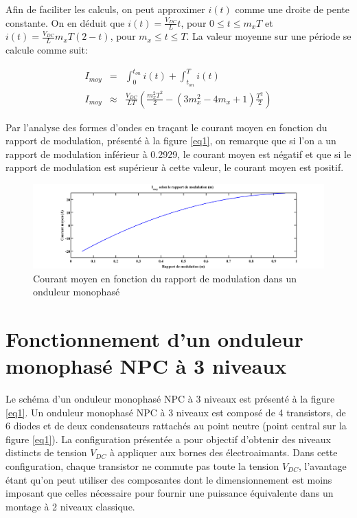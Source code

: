 \documentclass[11pt,letterpaper,final]{report}
\begin{document}
Afin de faciliter les calculs, on peut approximer $i(t)$ comme une droite de pente constante. On en déduit que $i(t) = \frac{V_{DC}}{L}t$, pour $0\leq t \leq m_x T$ et $i(t) = \frac{V_{DC}}{L} m_x T \left( 2 - t\right)$, pour $m_x\leq t \leq T$. La valeur moyenne sur une période se calcule comme suit:

\begin{eqnarray}
I_{moy} &=& \int_0^{t_{on}} i(t) + \int_{t_{on}}^{T} i(t)\\
I_{moy} &\approx & \frac{V_{DC}}{LT}\left(\frac{m_x^2 T^2}{2} -(3m_x^2 -4m_x +1)\frac{T^2}{2}\right)
\end{eqnarray}

Par l'analyse des formes d'ondes en traçant le courant moyen en fonction du rapport de modulation, présenté à la figure \ref{eq1}, on remarque que si l'on a un rapport de modulation inférieur à 0.2929, le courant moyen est négatif et que si le rapport de modulation est supérieur à cette valeur, le courant moyen est positif.

\begin{figure}[htb]
\centering
\includegraphics[scale=0.4]{Imoy_m.png}
\caption{Courant moyen en fonction du rapport de modulation dans un onduleur monophasé}
\end{figure}

\section{Fonctionnement d'un onduleur monophasé NPC à 3 niveaux}
Le schéma d'un onduleur monophasé NPC à 3 niveaux est présenté à la figure \ref{eq1}. Un onduleur monophasé NPC à 3 niveaux est composé de 4 transistors, de 6 diodes et de deux condensateurs rattachés au point neutre (point central sur la figure \ref{eq1}). La configuration présentée a pour objectif d'obtenir des niveaux distincts de tension $V_{DC}$ à appliquer aux bornes des électroaimants. Dans cette configuration, chaque transistor ne commute pas toute la tension $V_{DC}$, l'avantage étant qu'on peut utiliser des composantes dont le dimensionnement est moins imposant que celles nécessaire pour fournir une puissance équivalente dans un montage à 2 niveaux classique. 
\end{document}

